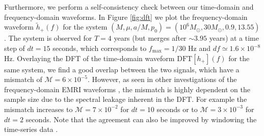 \documentclass[%
 reprint,
 nofootinbib,
 amsmath,amssymb,
 aps,
 prd,
]{revtex4-2}
\begin{document}
Furthermore, we perform a self-consistency check between our time-domain and frequency-domain waveforms. In Figure \ref{fig:dft} we plot the frequency-domain waveform $\tilde{h}_+(f)$ for the system $(M, \mu, a/M, p_0) = (10^6M_\odot, 30 M_\odot, 0.9, 13.55)$. The system is observed for $T=4$ years (but merges after $\sim 3.95$ years) at a time step of $dt=15$ seconds, which corresponds to $f_\mathrm{max} = 1/30$ Hz and $df \simeq 1.6\times 10^{-8}$ Hz. Overlaying the DFT of the time-domain waveform $\mathrm{DFT}[h_+](f)$ for the same system, we find a good overlap between the two signals, which have a mismatch of $\mathcal{M} = 6\times 10^{-5}$. However, as seen in other investigations of the frequency-domain EMRI waveforms \cite{SperETC23}, the mismatch is highly dependent on the sample size due to the spectral leakage inherent in the DFT. For example the mismatch increases to $\mathcal{M} = 7\times 10^{-2}$ for $dt=10$ seconds or to $\mathcal{M} = 3\times 10^{-3}$ for $dt=2$ seconds. Note that the agreement can also be improved by windowing the time-series data \cite{SperETC23}.





\end{document}
